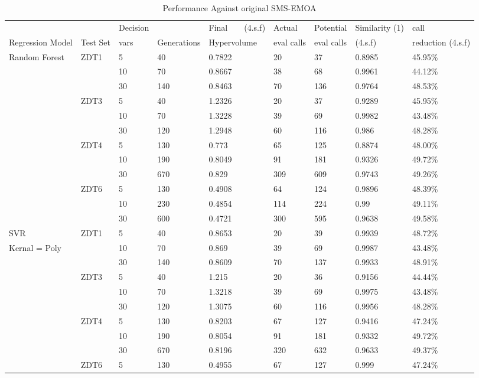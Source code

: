\documentclass[sigconf,review,nonacm]{acmart}
\begin{document}
\begin{table}[!htbp]
\caption{Performance Against original SMS-EMOA}
\begin{tabular}{l|llllll|l|l}
\label{Table1}
 & & Decision & & Final\ \ \ \ (4.s.f) & Actual & Potential & Similarity (1) & call \\ 
Regression Model & Test Set & vars & Generations & Hypervolume  & eval calls & eval calls &  (4.s.f) & reduction (4.s.f) \\ \hline
Random Forest & ZDT1 & 5 & 40 & 0.7822 & 20 & 37 & 0.8985 & 45.95\% \\
 & & 10 & 70 & 0.8667 & 38 & 68 & 0.9961 & 44.12\% \\
 & & 30 & 140 & 0.8463 & 70 & 136 & 0.9764 & 48.53\% \\
 & ZDT3 & 5 & 40 & 1.2326 & 20 & 37 & 0.9289 & 45.95\% \\
 & & 10 & 70 & 1.3228 & 39 & 69 & 0.9982 & 43.48\% \\
 & & 30 & 120 & 1.2948 & 60 & 116 & 0.986 & 48.28\% \\
 & ZDT4 & 5 & 130 & 0.773 & 65 & 125 & 0.8874 & 48.00\% \\
 & & 10 & 190 & 0.8049 & 91 & 181 & 0.9326 & 49.72\% \\
 & & 30 & 670 & 0.829 & 309 & 609 & 0.9743 & 49.26\% \\
 & ZDT6 & 5 & 130 & 0.4908 & 64 & 124 & 0.9896 & 48.39\% \\
 & & 10 & 230 & 0.4854 & 114 & 224 & 0.99 & 49.11\% \\
 & & 30 & 600 & 0.4721 & 300 & 595 & 0.9638 & 49.58\% \\ \hline
SVR & ZDT1 & 5 & 40 & 0.8653 & 20 & 39 & 0.9939 & 48.72\% \\
Kernal = Poly & & 10 & 70 & 0.869 & 39 & 69 & 0.9987 & 43.48\% \\
 & & 30 & 140 & 0.8609 & 70 & 137 & 0.9933 & 48.91\% \\
 & ZDT3 & 5 & 40 & 1.215 & 20 & 36 & 0.9156 & 44.44\% \\
 & & 10 & 70 & 1.3218 & 39 & 69 & 0.9975 & 43.48\% \\
 & & 30 & 120 & 1.3075 & 60 & 116 & 0.9956 & 48.28\% \\
 & ZDT4 & 5 & 130 & 0.8203 & 67 & 127 & 0.9416 & 47.24\% \\
 & & 10 & 190 & 0.8054 & 91 & 181 & 0.9332 & 49.72\% \\
 & & 30 & 670 & 0.8196 & 320 & 632 & 0.9633 & 49.37\% \\
 & ZDT6 & 5 & 130 & 0.4955 & 67 & 127 & 0.999 & 47.24\% \\

\end{tabular}
\end{table}
\end{document}
